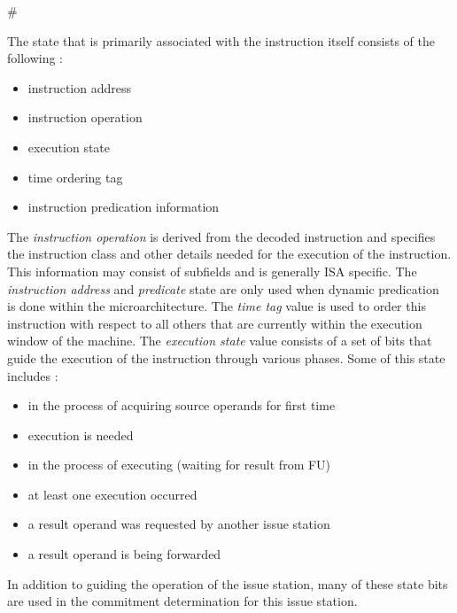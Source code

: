 #\documentclass[10pt,dvips]{article}
\begin{document}
The state that is primarily associated with the instruction itself
consists of the following :
%
\begin{itemize}
\vspace{-0.10in}
\item{instruction address}
\vspace{-0.10in}
\item{instruction operation}
\vspace{-0.10in}
\item{execution state}
\vspace{-0.10in}
\item{time ordering tag}
\vspace{-0.10in}
\item{instruction predication information}
\vspace{-0.10in}
\end{itemize}   
%
The \textit{instruction operation} is derived from the decoded
instruction and specifies the instruction class and other
details needed for the execution of the instruction.
This information may consist of subfields and is generally ISA
specific.
The \textit{instruction address} and \textit{predicate} state
are only used when dynamic predication~\cite{undisclosed2}
is done within the microarchitecture.
The \textit{time tag} value is used to order this instruction
with respect to all others that are currently within the execution
window of the machine.
The \textit{execution state} value consists of a set of
bits that guide the execution of the instruction through
various phases.  Some of this state includes :
%
\begin{itemize}
\vspace{-0.10in}
\item{in the process of acquiring source operands for first time}
\vspace{-0.10in}
\item{execution is needed}
\vspace{-0.10in}
\item{in the process of executing (waiting for result from FU)}
\vspace{-0.10in}
\item{at least one execution occurred}
\vspace{-0.10in}
\item{a result operand was requested by another issue station}
\vspace{-0.10in}
\item{a result operand is being forwarded}
\vspace{-0.10in}
\end{itemize}   
%
In addition to guiding the operation of the issue station,
many of these state bits are used in the commitment determination
for this issue station.
\end{document}
